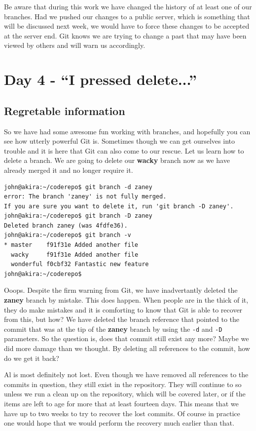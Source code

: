 Be aware that during this work we have changed the history of at least one of our branches.  Had we pushed our changes to a public server, which is something that will be discussed next week, we would have to force these changes to be accepted at the server end.  Git knows we are trying to change a past that may have been viewed by others and will warn us accordingly.

\section{Day 4 - ``I pressed delete...''}
\subsection{Regretable information}

So we have had some awesome fun working with branches, and hopefully you can see how utterly powerful Git is.  Sometimes though we can get ourselves into trouble and it is here that Git can also come to our rescue.  Let us learn how to delete a branch.  We are going to delete our \textbf{wacky} branch now as we have already merged it and no longer require it.

\begin{Verbatim}[frame=leftline,framerule=1mm,fontsize=\relsize{-3}] 
john@akira:~/coderepo$ git branch -d zaney
error: The branch 'zaney' is not fully merged.
If you are sure you want to delete it, run 'git branch -D zaney'.
john@akira:~/coderepo$ git branch -D zaney
Deleted branch zaney (was 4fdfe36).
john@akira:~/coderepo$ git branch -v
* master    f91f31e Added another file
  wacky     f91f31e Added another file
  wonderful f0cbf32 Fantastic new feature
john@akira:~/coderepo$ 
\end{Verbatim}

Ooops.  Despite the firm warning from Git, we have inadvertantly deleted the \textbf{zaney} branch by mistake.  This does happen.  When people are in the thick of it, they do make mistakes and it is comforting to know that Git is able to recover from this, but how?  We have deleted the branch reference that pointed to the commit that was at the tip of the \textbf{zaney} branch by using the \texttt{-d} and \texttt{-D} parameters.  So the question is, does that commit still exist any more?  Maybe we did more damage than we thought.  By deleting all references to the commit, how do we get it back?

Al is most definitely not lost.  Even though we have removed all references to the commits in question, they still exist in the repository.  They will continue to so unless we run a clean up on the repository, which will be covered later, or if the items are left to age for more that at least fourteen days.  This means that we have up to two weeks to try to recover the lost commits.  Of course in practice one would hope that we would perform the recovery much earlier than that.


